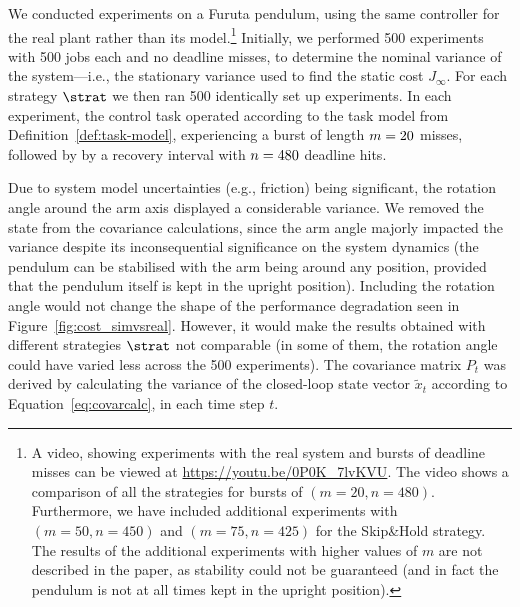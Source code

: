 We conducted experiments on a Furuta pendulum, using the same controller for the real plant rather than its model.\footnote{A video, showing experiments with the real system and bursts of deadline misses can be viewed at \url{https://youtu.be/0P0K_7lvKVU}. The video shows a comparison of all the strategies for bursts of $(m = 20, n=480)$. Furthermore, we have included additional experiments with $(m=50, n=450)$ and $(m=75, n=425)$ for the Skip\&Hold strategy. The results of the additional experiments with higher values of $m$ are not described in the paper, as stability could not be guaranteed (and in fact the pendulum is not at all times kept in the upright position).}
Initially, we performed 500 experiments with 500 jobs each and no deadline misses, to determine the nominal variance of the system---i.e., the stationary variance used to find the static cost $J_\infty$.
For each strategy $\strat$ we then ran 500 identically set up experiments. 
In each experiment, the control task operated according to the task model from Definition~\ref{def:task-model}, experiencing a burst of length $m=20$ misses, followed by by a recovery interval with $n=480$ deadline hits.

Due to system model uncertainties (e.g., friction) being significant, the rotation angle around the arm axis displayed a considerable variance.
We removed the state from the covariance calculations, since the arm angle majorly impacted the variance despite its inconsequential significance on the system dynamics (the pendulum can be stabilised with the arm being around any position, provided that the pendulum itself is kept in the upright position).
Including the rotation angle would not change the shape of the performance degradation seen in Figure~\ref{fig:cost_simvsreal}. 
However, it would make the results obtained with different strategies $\strat$ not comparable (in some of them, the rotation angle could have varied less across the 500 experiments). 
The covariance matrix $P_t$ was derived by calculating the variance of the closed-loop state vector $\tilde{x}_t$ according to Equation~\eqref{eq:covarcalc}, in each time step $t$. 

